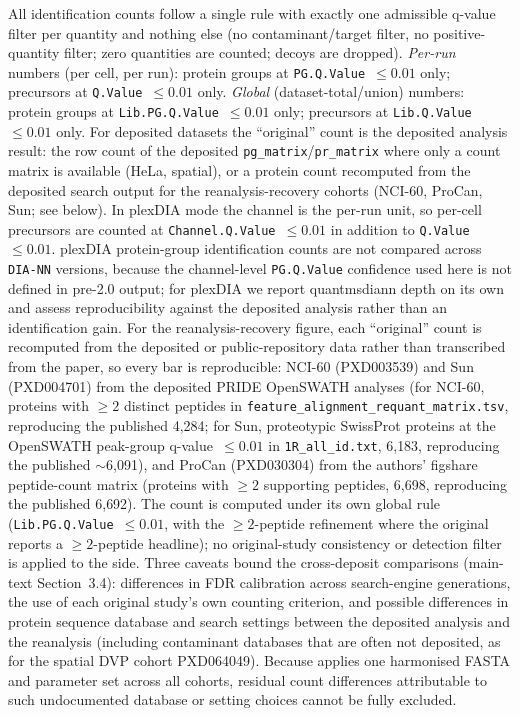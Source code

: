 \documentclass[preprint,12pt]{elsarticle}
\begin{document}
All \quantmsdiann{} identification counts follow a single rule with exactly one admissible q-value filter per quantity and nothing else (no contaminant/target filter, no positive-quantity filter; zero quantities are counted; decoys are dropped). \emph{Per-run} numbers (per cell, per run): protein groups at \texttt{PG.Q.Value}~$\leq 0.01$ only; precursors at \texttt{Q.Value}~$\leq 0.01$ only. \emph{Global} (dataset-total/union) numbers: protein groups at \texttt{Lib.PG.Q.Value}~$\leq 0.01$ only; precursors at \texttt{Lib.Q.Value}~$\leq 0.01$ only. For deposited datasets the ``original'' count is the deposited analysis result: the row count of the deposited \texttt{pg\_matrix}/\texttt{pr\_matrix} where only a count matrix is available (HeLa, spatial), or a protein count recomputed from the deposited search output for the reanalysis-recovery cohorts (NCI-60, ProCan, Sun; see below). In plexDIA mode the channel is the per-run unit, so per-cell precursors are counted at \texttt{Channel.Q.Value}~$\leq 0.01$ in addition to \texttt{Q.Value}~$\leq 0.01$. plexDIA protein-group identification counts are not compared across \texttt{DIA-NN} versions, because the channel-level \texttt{PG.Q.Value} confidence used here is not defined in pre-2.0 output; for plexDIA we report quantmsdiann depth on its own and assess reproducibility against the deposited analysis rather than an identification gain.
For the reanalysis-recovery figure, each ``original'' count is recomputed from the deposited or public-repository data rather than transcribed from the paper, so every bar is reproducible: NCI-60 (PXD003539) and Sun (PXD004701) from the deposited PRIDE OpenSWATH analyses (for NCI-60, proteins with $\geq 2$ distinct peptides in \texttt{feature\_alignment\_requant\_matrix.tsv}, reproducing the published 4{,}284; for Sun, proteotypic SwissProt proteins at the OpenSWATH peak-group q-value~$\leq 0.01$ in \texttt{1R\_all\_id.txt}, 6{,}183, reproducing the published $\sim$6{,}091), and ProCan (PXD030304) from the authors' figshare peptide-count matrix (proteins with $\geq 2$ supporting peptides, 6{,}698, reproducing the published 6{,}692). The \quantmsdiann{} count is computed under its own global rule (\texttt{Lib.PG.Q.Value}~$\leq 0.01$, with the $\geq 2$-peptide refinement where the original reports a $\geq 2$-peptide headline); no original-study consistency or detection filter is applied to the \quantmsdiann{} side. Three caveats bound the cross-deposit comparisons (main-text Section~3.4): differences in FDR calibration across search-engine generations, the use of each original study's own counting criterion, and possible differences in protein sequence database and search settings between the deposited analysis and the reanalysis (including contaminant databases that are often not deposited, as for the spatial DVP cohort PXD064049). Because \quantmsdiann{} applies one harmonised FASTA and parameter set across all cohorts, residual count differences attributable to such undocumented database or setting choices cannot be fully excluded.
\end{document}
